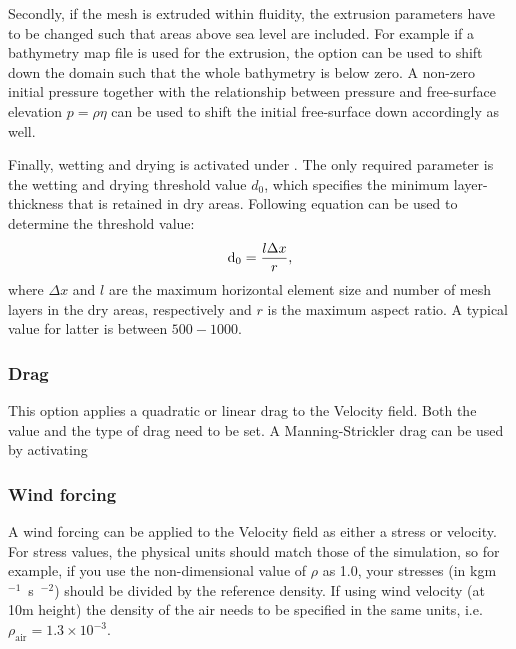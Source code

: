 Secondly, if the mesh is extruded within fluidity, the extrusion parameters have to be changed such that areas above sea level are included.
For example if a bathymetry map file is used for the extrusion, the option 
can be used to shift down the domain such that the whole bathymetry is below zero.
A non-zero initial pressure together with the relationship between pressure and free-surface elevation $p = \rho \eta$ can be used to shift the initial free-surface down accordingly as well.

Finally, wetting and drying is activated under .
The only required parameter is the wetting and drying threshold value $d_0$, which specifies the minimum layer-thickness that is retained in dry areas. 
Following equation can be used to determine the threshold value:
\begin{equation*}
\mathrm{d}_0 = \frac{l\Delta x}{r},
\end{equation*}
where $\Delta x$ and $l$ are the maximum horizontal element size and number of mesh layers in the dry areas, respectively and $r$ is the maximum aspect ratio. A typical value for latter is between $500-1000$.


\subsubsection{Drag}

This option applies a quadratic or linear drag to the Velocity field. Both the value and the type of drag need to be set. A Manning-Strickler drag can be used by activating 

\subsubsection{Wind forcing}\label{sec:wind_forcing}

A wind forcing can be applied to the Velocity field as either a stress or
velocity. For stress values, the physical units should match those of the
simulation, so for example, if you use the non-dimensional value of $\rho$
as 1.0, your stresses (in \unit{kgm\ensuremath{^{-1}}s\ensuremath{^{-2}}})
should be divided by the reference density.  If using wind velocity
(at 10m height) the density of the air needs to be specified in the same
units, i.e. $\rho_{\textrm{air}} = 1.3\times10^{-3}$.

